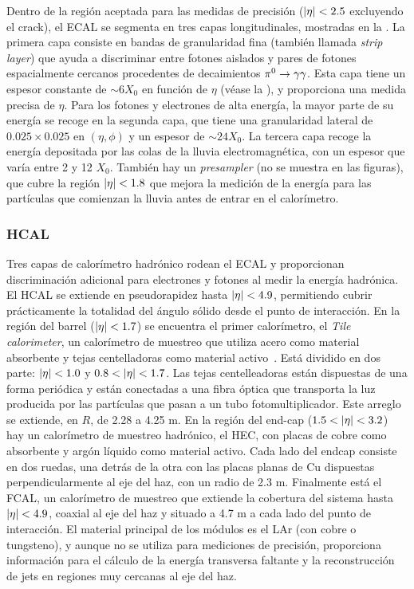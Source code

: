 Dentro de la región aceptada para las medidas de precisión (\(|\eta|<2.5\) excluyendo el crack), el \ac{ECAL} se segmenta en tres capas longitudinales, mostradas en la \Fig{\ref{fig:atlas:atlas:cals:ecal:ecal_cells}}.
La primera capa consiste en bandas de granularidad fina (también llamada \textit{strip layer}) que ayuda a discriminar entre fotones aislados y pares de fotones espacialmente cercanos procedentes de decaimientos \(\pi^{0}\rightarrow\gamma\gamma\). Esta capa tiene un espesor constante de \(\sim 6 X_0\) en función de \(\eta\) (véase la \Fig{\ref{fig:atlas:atlas:cals:ecal:ecal_radiation_length}}), y proporciona una medida precisa de \(\eta\).
Para los fotones y electrones de alta energía, la mayor parte de su energía se recoge en la segunda capa, que tiene una granularidad lateral de \(0.025 \times 0.025\) en \((\eta, \phi)\) y un espesor de \(\sim 24 X_0\).
La tercera capa recoge la energía depositada por las colas de la lluvia electromagnética, con un espesor que varía entre 2 y 12 \(X_0\).
También hay un \textit{presampler} (no se muestra en las figuras), que cubre la región \(|\eta|<1.8\) que mejora la medición de la energía para las partículas que comienzan la lluvia antes de entrar en el calorímetro.




\subsubsection{\acf{HCAL}}



Tres capas de calorímetro hadrónico rodean el \ac{ECAL} y proporcionan discriminación adicional para electrones y fotones al medir la energía hadrónica. El \ac{HCAL} se extiende en pseudorapidez hasta \(|\eta|<4.9\), permitiendo cubrir prácticamente la totalidad del ángulo sólido desde el punto de interacción. En la región del barrel (\(|\eta|<1.7\)) se encuentra el primer calorímetro, el \textit{Tile calorimeter}, un calorímetro de muestreo que utiliza acero como material absorbente y tejas centelladoras como material activo~\cite{ATLAS-Tile-TDR}. Está dividido en dos parte: \(|\eta|<1.0\) y \(0.8<\abseta<1.7\). Las tejas centelleadoras están dispuestas de una forma periódica y están conectadas a una fibra óptica que transporta la luz producida por las partículas que pasan a un tubo fotomultiplicador. Este arreglo se extiende, en \(R\), de 2.28 a 4.25 m. En la región del end-cap (\(1.5<\abseta<3.2\)) hay un calorímetro de muestreo hadrónico, el \acf{HEC}, con placas de cobre como absorbente y argón líquido como material activo. Cada lado del endcap consiste en dos ruedas, una detrás de la otra con las placas planas de Cu dispuestas perpendicularmente al eje del haz, con un radio de 2.3 m. Finalmente está el \ac{FCAL}, un calorímetro de muestreo que extiende la cobertura del sistema hasta \(|\eta|<4.9\), coaxial al eje del haz y situado a 4.7 m a cada lado del punto de interacción. El material principal de los módulos es el \ac{LAr} (con cobre o tungsteno), y aunque no se utiliza para mediciones de precisión, proporciona información para el cálculo de la energía transversa faltante y la reconstrucción de jets en regiones muy cercanas al eje del haz.

